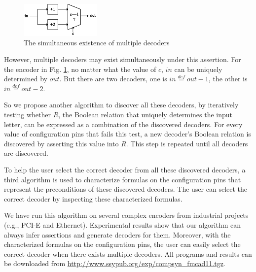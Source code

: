 \documentclass[journal]{IEEEtran}
\begin{document}
\begin{figure}[b]
\begin{center}
\includegraphics[width=0.35\textwidth]{multidec}
\end{center}
\caption{The simultaneous existence of multiple decoders}
  \label{multidec}
\end{figure}


However,
multiple decoders may exist simultaneously under this assertion.
For the encoder in Fig. \ref{multidec},
no matter what the value of $c$,
$in$ can be uniquely determined by $out$.
But there are two decoders,
one is $in\stackrel{def}{=}out-1$,
the other is $in\stackrel{def}{=}out-2$.

So we propose another algorithm to discover all these decoders,
by iteratively testing whether $R$,
the Boolean relation that uniquely determines the input letter,
can be expressed as a combination of the discovered decoders.
For every value of configuration pins that fails this test,
a new decoder's Boolean relation is discovered by asserting this value into $R$.
This step is repeated until all decoders are discovered.

To help the user select the correct decoder from all these discovered decoders,
a third algorithm is used to characterize formulas on the configuration pins that represent the preconditions of these discovered decoders.
The user can select the correct decoder by inspecting these characterized formulas.

We have run this algorithm on several complex encoders from industrial projects
(e.g.,
PCI-E\cite{PCIESPEC} and Ethernet\cite{IEEE80232002}).
Experimental results show that
our algorithm can always infer assertions and generate decoders for them.
Moreover,
with the characterized formulas on the configuration pins,
the user can easily select the correct decoder when there exists multiple decoders.
All programs and results can be downloaded from \url{http://www.ssypub.org/exp/compsyn_fmcad11.tgz}.
\end{document}
